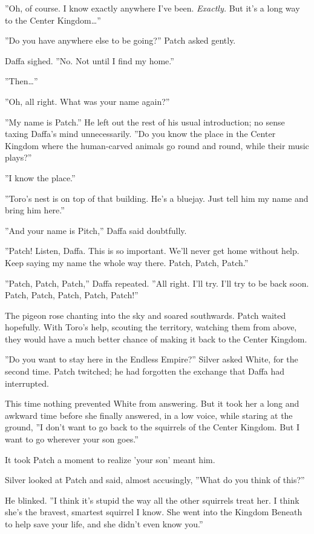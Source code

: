 \documentclass[12pt]{book}
\begin{document}
''Oh, of course. I know exactly anywhere I've been. \textit{Exactly.}
But it's a long way to the Center Kingdom\ldots{}''

''Do you have anywhere else to be going?'' Patch asked gently.

Daffa sighed. ''No. Not until I find my home.''

''Then\ldots{}''

''Oh, all right. What was your name again?''

''My name is Patch.'' He left out the rest of his usual introduction;
no sense taxing Daffa's mind unnecessarily. ''Do you know the place in
the Center Kingdom where the human-carved animals go round and round,
while their music plays?''

''I know the place.''

''Toro's nest is on top of that building. He's a bluejay. Just tell
him my name and bring him here.''

''And your name is Pitch,'' Daffa said doubtfully.

''Patch! Listen, Daffa. This is so important. We'll never get home
without help. Keep saying my name the whole way there. Patch, Patch,
Patch.''

''Patch, Patch, Patch,'' Daffa repeated. ''All right. I'll try. I'll
try to be back soon. Patch, Patch, Patch, Patch, Patch!''

The pigeon rose chanting into the sky and soared southwards. Patch
waited hopefully. With Toro's help, scouting the territory, watching
them from above, they would have a much better chance of making it
back to the Center Kingdom.

''Do you want to stay here in the Endless Empire?'' Silver asked
White, for the second time. Patch twitched; he had forgotten the
exchange that Daffa had interrupted.

This time nothing prevented White from answering. But it took her a
long and awkward time before she finally answered, in a low voice,
while staring at the ground, ''I don't want to go back to the
squirrels of the Center Kingdom. But I want to go wherever your son
goes.''

It took Patch a moment to realize 'your son' meant him.

Silver looked at Patch and said, almost accusingly, ''What do you
think of this?''

He blinked. ''I think it's stupid the way all the other squirrels
treat her. I think she's the bravest, smartest squirrel I know. She
went into the Kingdom Beneath to help save your life, and she didn't
even know you.''
\end{document}
